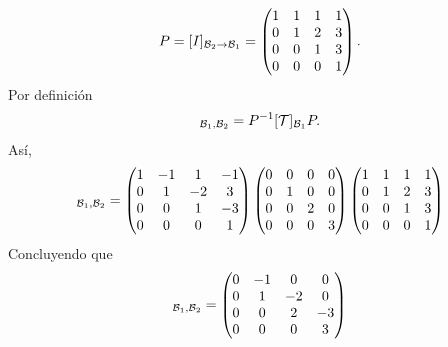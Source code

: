 \documentclass[12pt,a4paper]{article}
\begin{document}
\begin{solucion}
        \begin{equation*}
            P=[I]_{\mathcal{B}_{2}\to\mathcal{B}_{1}}=
            \begin{pmatrix}
                1 & 1 & 1 & 1\\
                0 & 1 & 2 & 3\\
                0 & 0 & 1 & 3\\
                0 & 0 & 0 & 1
            \end{pmatrix}.
        \end{equation*}
        Por definición
        \begin{equation*}
            [\TT]_{\BB_{1},\BB_{2}}=P^{-1}[\TT]_{\BB_{1}}P.
        \end{equation*}
        Así,
        \begin{equation*}
            [\TT]_{\BB_{1},\BB_{2}}=
            \begin{pmatrix}
                1 & -1 & 1 & -1\\
                0 & 1 & -2 & 3\\
                0 & 0 & 1 & -3\\
                0 & 0 & 0 & 1
            \end{pmatrix}
            \begin{pmatrix}
                0 & 0 & 0 & 0\\
                0 & 1 & 0 & 0\\
                0 & 0 & 2 & 0\\
                0 & 0 & 0 & 3
            \end{pmatrix}
            \begin{pmatrix}
                1 & 1 & 1 & 1\\
                0 & 1 & 2 & 3\\
                0 & 0 & 1 & 3\\
                0 & 0 & 0 & 1
            \end{pmatrix}
        \end{equation*}
        Concluyendo que
        \begin{equation*}
            [\TT]_{\BB_{1},\BB_{2}}=
            \begin{pmatrix}
                0 & -1 & 0 & 0\\
                0 & 1 & -2 & 0\\
                0 & 0 & 2 & -3\\
                0 & 0 & 0 & 3
            \end{pmatrix}
        \end{equation*}

\end{solucion}
\end{document}
